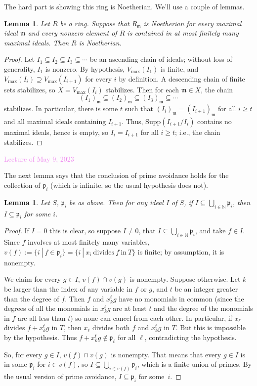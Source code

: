 \documentclass{amsart}[12pt]
\newcommand{\May}[1]{\textcolor{violet}{Lecture of May #1, 2023}}
\newcommand{\N}{\mathbb{N}}
\newcommand{\fp}{{\mathfrak p}}
\newcommand{\fm}{{\mathfrak m}}
\numberwithin{equation}{section}
\theoremstyle{plain} %
\newtheorem{lem}[equation]{Lemma}
\theoremstyle{definition}
\theoremstyle{remark}
\begin{document}
The hard part is showing this ring is Noetherian. We'll use a couple of lemmas.

\begin{lem} Let $R$ be a ring. Suppose that $R_\fm$ is Noetherian for every maximal ideal $\fm$ and every nonzero element of $R$ is contained in at most finitely many maximal ideals. Then $R$ is Noetherian.
\end{lem}
\begin{proof}
Let $I_1\subseteq I_2 \subseteq I_3 \subseteq \cdots$ be an ascending chain of ideals; without loss of generality, $I_1$ is nonzero. By hypothesis, $V_{\max}(I_1)$ is finite, and $V_{\max}(I_i) \supseteq V_{\max}(I_{i+1})$ for every $i$ by definition. A descending chain of finite sets stabilizes, so $X=V_{\max}(I_i)$ stabilizes.  Then for each $\fm\in X$, the chain 
\[(I_1)_{\fm} \subseteq (I_2)_{\fm} \subseteq (I_3)_{\fm} \subseteq \cdots\]
stabilizes. In particular, there is some $t$ such that $(I_i)_{\fm} = (I_{i+1})_{\fm}$ for all $i\geq t$ and all maximal ideals containing $I_{i+1}$. Thus, $\mathrm{Supp}(I_{i+1}/I_i)$ contains no maximal ideals, hence is empty, so $I_i=I_{i+1}$ for all $i\geq t$; i.e., the chain stabilizes.
\end{proof}

\May{9}

The next lemma says that the conclusion of prime avoidance holds for the collection of $\fp_i$ (which is infinite, so the usual hypothesis does not).

\begin{lem} Let $S$, $\fp_i$ be as above. Then for any ideal $I$ of $S$, if $I\subseteq \bigcup_{i\in \N} \fp_i$, then $I\subseteq \fp_i$ for some $i$.
\end{lem}
\begin{proof} If $I=0$ this is clear, so suppose $I\neq 0$, that $I\subseteq \bigcup_{i\in \N} \fp_i$, and take $f\in I$. Since $f$ involves at most finitely many variables, $v(f):=\{i \ | \ f\in \fp_i\}= \{ i \ | \ x_i \ \text{divides} \ f \ \text{in} \ T\}$ is finite; by assumption, it is nonempty. 

We claim for every $g\in I$, $v(f) \cap v(g)$ is nonempty. Suppose otherwise. Let $k$ be larger than the index of any variable in $f$ or $g$, and $t$ be an integer greater than the degree of $f$. Then $f$ and $x_k^t g$ have no monomials in common (since the degrees of all the monomials in $x_k^t g$ are at least $t$ and the degree of the monomials in $f$ are all less than $t$) so none can cancel from each other. In particular, if $x_\ell$ divides $f+x_k^t g$ in $T$, then $x_\ell$  divides both $f$ and $x_k^t g$ in $T$. But this is impossible by the hypothesis. Thus $f+x_k^t g\notin \fp_\ell$ for all $\ell$, contradicting the hypothesis.

So, for every $g\in I$, $v(f) \cap v(g)$ is nonempty. That means that every $g\in I$ is in some $\fp_i$ for $i  \in v(f)$, so $I \subseteq \bigcup_{i\in v(f)} \fp_i$, which is a finite union of primes. By the usual version of prime avoidance, $I \subseteq \fp_i$ for some~$i$.
\end{proof}
\end{document}
